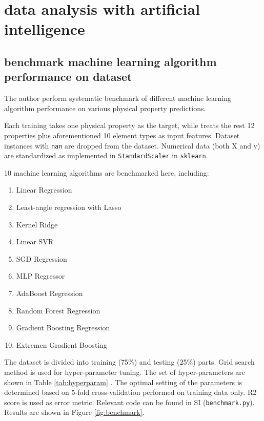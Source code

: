 \documentclass[10pt,aps,prb,amsmath,amssymb,twocolumn,letterpaper,nobalancelastpage,final,citeautoscript,floatfix,raggedbottom,superscriptaddress]{revtex4-1}
\begin{document}
\section{data analysis with artificial intelligence}

\subsection{benchmark machine learning algorithm performance on dataset}

The author perform systematic benchmark of different machine learning algorithm performance on various physical property predictions.

Each training takes one physical property as the target, while treats the rest 12 properties plus aforementioned 10 element types as input features. Dataset instances with \texttt{nan} are dropped from the dataset. Numerical data (both X and y) are standardized as implemented in \texttt{StandardScaler} in \texttt{sklearn}.



10 machine learning algorithms are benchmarked here, including:
\begin{enumerate}
	\item Linear Regression	
	\item Least-angle regression with Lasso
	\item Kernel Ridge
	\item Linear SVR
	\item SGD Regression
	\item MLP Regressor
	\item AdaBoost Regression
	\item Random Forest Regression
	\item Gradient Boosting Regression
	\item Extremen Gradient Boosting
\end{enumerate}


The dataset is divided into training (75\%) and testing (25\%) parts. Grid search method is used for hyper-parameter tuning. The set of hyper-parameters are shown in Table \ref{tab:hyperparam} . The optimal setting of the parameters is determined based on 5-fold cross-validation performed on training data only. R2 score is used as error metric. Relevant code can be found in SI (\texttt{benchmark.py}). Results are shown in Figure \ref{fig:benchmark}.
\end{document}
